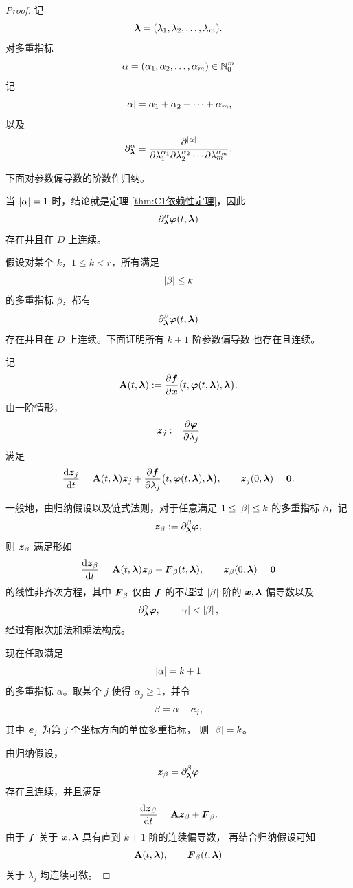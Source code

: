 \begin{proof}
	记
	\[
	\boldsymbol{\lambda}
	=
	(\lambda_1,\lambda_2,\ldots,\lambda_m).
	\]
	对多重指标
	\[
	\alpha=(\alpha_1,\alpha_2,\ldots,\alpha_m)\in\mathbb{N}_0^m
	\]
	记
	\[
	\left| \alpha \right|
	=
	\alpha_1+\alpha_2+\cdots+\alpha_m,
	\]
	以及
	\[
	\partial_{\boldsymbol{\lambda}}^\alpha
	=
	\frac{
		\partial^{\left| \alpha \right|}
	}{
		\partial\lambda_1^{\alpha_1}
		\partial\lambda_2^{\alpha_2}
		\cdots
		\partial\lambda_m^{\alpha_m}
	}.
	\]
	
	下面对参数偏导数的阶数作归纳。
	
	当 $\left| \alpha \right|=1$ 时，结论就是定理
	\ref{thm:C1依赖性定理}，因此
	\[
	\partial_{\boldsymbol{\lambda}}^\alpha
	\boldsymbol{\varphi}(t,\boldsymbol{\lambda})
	\]
	存在并且在 $D$ 上连续。
	
	假设对某个 $k$，$1\leq k<r$，所有满足
	\[
	\left| \beta \right|\leq k
	\]
	的多重指标 $\beta$，都有
	\[
	\partial_{\boldsymbol{\lambda}}^\beta
	\boldsymbol{\varphi}(t,\boldsymbol{\lambda})
	\]
	存在并且在 $D$ 上连续。下面证明所有 $k+1$ 阶参数偏导数
	也存在且连续。
	
	记
	\[
	\mathbf{A}(t,\boldsymbol{\lambda})
	\mathrel{:=}
	\frac{\partial\boldsymbol{f}}{\partial\boldsymbol{x}}
	\bigl(
	t,\boldsymbol{\varphi}(t,\boldsymbol{\lambda}),\boldsymbol{\lambda}
	\bigr).
	\]
	由一阶情形，
	\[
	\boldsymbol{z}_j
	\mathrel{:=}
	\frac{\partial\boldsymbol{\varphi}}{\partial\lambda_j}
	\]
	满足
	\[
	\frac{\mathrm{d}\boldsymbol{z}_j}{\mathrm{d} t}
	=
	\mathbf{A}(t,\boldsymbol{\lambda})\boldsymbol{z}_j
	+
	\frac{\partial\boldsymbol{f}}{\partial\lambda_j}
	\bigl(
	t,\boldsymbol{\varphi}(t,\boldsymbol{\lambda}),\boldsymbol{\lambda}
	\bigr),
	\qquad
	\boldsymbol{z}_j(0,\boldsymbol{\lambda})=\boldsymbol{0}.
	\]
	
	一般地，由归纳假设以及链式法则，对于任意满足
	$1\leq\left| \beta \right|\leq k$ 的多重指标 $\beta$，记
	\[
	\boldsymbol{z}_{\beta}
	\mathrel{:=}
	\partial_{\boldsymbol{\lambda}}^\beta
	\boldsymbol{\varphi},
	\]
	则 $\boldsymbol{z}_{\beta}$ 满足形如
	\[
	\frac{\mathrm{d}\boldsymbol{z}_{\beta}}{\mathrm{d} t}
	=
	\mathbf{A}(t,\boldsymbol{\lambda})\boldsymbol{z}_{\beta}
	+
	\boldsymbol{F}_{\beta}(t,\boldsymbol{\lambda}),
	\qquad
	\boldsymbol{z}_{\beta}(0,\boldsymbol{\lambda})=\boldsymbol{0}
	\]
	的线性非齐次方程，其中
	$\boldsymbol{F}_{\beta}$ 仅由
	$\boldsymbol{f}$ 的不超过 $\left| \beta \right|$ 阶的
	$\boldsymbol{x},\boldsymbol{\lambda}$ 偏导数以及
	\[
	\partial_{\boldsymbol{\lambda}}^\gamma
	\boldsymbol{\varphi},
	\qquad
	\left| \gamma \right|<\left| \beta \right|,
	\]
	经过有限次加法和乘法构成。
	
	现在任取满足
	\[
	\left| \alpha \right|=k+1
	\]
	的多重指标 $\alpha$。取某个 $j$ 使得
	$\alpha_j\geq1$，并令
	\[
	\beta=\alpha-\boldsymbol{e}_j,
	\]
	其中 $\boldsymbol{e}_j$ 为第 $j$ 个坐标方向的单位多重指标，
	则 $\left| \beta \right|=k$。
	
	由归纳假设，
	\[
	\boldsymbol{z}_{\beta}
	=
	\partial_{\boldsymbol{\lambda}}^\beta
	\boldsymbol{\varphi}
	\]
	存在且连续，并且满足
	\[
	\frac{\mathrm{d}\boldsymbol{z}_{\beta}}{\mathrm{d} t}
	=
	\mathbf{A}\boldsymbol{z}_{\beta}
	+
	\boldsymbol{F}_{\beta}.
	\]
	由于 $\boldsymbol{f}$ 关于
	$\boldsymbol{x},\boldsymbol{\lambda}$ 具有直到 $k+1$ 阶的连续偏导数，
	再结合归纳假设可知
	\[
	\mathbf{A}(t,\boldsymbol{\lambda}),
	\qquad
	\boldsymbol{F}_{\beta}(t,\boldsymbol{\lambda})
	\]
	关于 $\lambda_j$ 均连续可微。
	

\end{proof}
